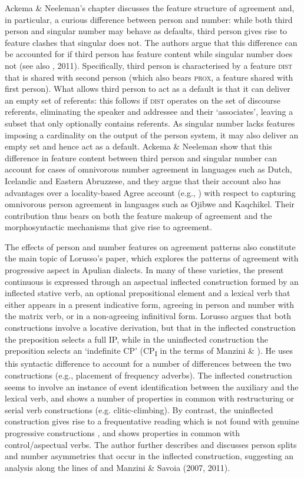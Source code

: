 \documentclass[output=paper]{langsci/langscibook}
\begin{document}
Ackema \& Neeleman’s chapter discusses the feature structure of agreement and, in particular, a curious difference between person and number: while both third person and singular number may behave as defaults, third person gives rise to feature clashes that singular does not. The authors argue that this difference can be accounted for if third person has feature content while singular number does not (see also \citealt{Nevins2007}, 2011). Specifically, third person is characterised by a feature \textsc{dist} that is shared with second person (which also bears \textsc{prox}, a feature shared with first person). What allows third person to act as a default is that it can deliver an empty set of referents: this follows if \textsc{dist} operates on the set of discourse referents, eliminating the speaker and addressee and their ‘associates’, leaving a subset that only optionally contains referents. As singular number lacks features imposing a cardinality on the output of the person system, it may also deliver an empty set and hence act as a default. Ackema \& Neeleman show that this difference in feature content between third person and singular number can account for cases of omnivorous number agreement in languages such as Dutch, Icelandic and Eastern Abruzzese, and they argue that their account also has advantages over a locality-based Agree account (e.g., \citealt{Preminger2014}) with respect to capturing omnivorous person agreement in languages such as Ojibwe and Kaqchikel. Their contribution thus bears on both the feature makeup of agreement and the morphosyntactic mechanisms that give rise to agreement.

The effects of person and number features on agreement patterns also constitute the main topic of Lorusso’s paper, which explores the patterns of agreement with progressive aspect in Apulian dialects. In many of these varieties, the present continuous is expressed through an aspectual inflected construction formed by an inflected stative verb, an optional prepositional element and a lexical verb that either appears in a present indicative form, agreeing in person and number with the matrix verb, or in a non-agreeing infinitival form. Lorusso argues that both constructions involve a locative derivation, but that in the inflected construction the preposition selects a full IP, while in the uninflected construction the preposition selects an ‘indefinite CP' (CP\textsubscript{I} in the terms of Manzini \& \citealt{Savoia2003}). He uses this syntactic difference to account for a number of differences between the two constructions (e.g., placement of frequency adverbs). The inflected construction seems to involve an instance of event identification \citep{Kratzer1996} between the auxiliary and the lexical verb, and shows a number of properties in common with restructuring or serial verb constructions (e.g. clitic-climbing). By contrast, the uninflected construction gives rise to a frequentative reading which is not found with genuine progressive constructions \citep{Chierchia1995}, and shows properties in common with control/aspectual verbs. The author further describes and discusses person splits and number asymmetries that occur in the inflected construction, suggesting an analysis along the lines of \citet{Bobalijk2008} and Manzini \& Savoia (2007, 2011).
\end{document}
